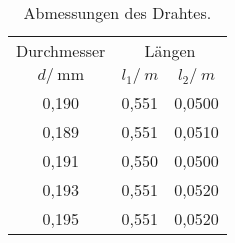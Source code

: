 \begin{table}[H]
	\centering
	\begin{tabular}{c cc}
		\toprule
		{Durchmesser} & \multicolumn{2}{c}{Längen} \\
		{$d/\:\si{\milli\meter}$} & {$l_1/\:\si{m}$} & {$l_2/\:\si{m}$}\\
		\midrule
			0,190 & 0,551 & 0,0500 \\
			0,189 & 0,551 & 0,0510 \\
			0,191 & 0,550 & 0,0500 \\
			0,193 & 0,551 & 0,0520 \\
			0,195 & 0,551 & 0,0520 \\
		\bottomrule
	\end{tabular}
	\caption{Abmessungen des Drahtes.}
	\label{tab:draht}
\end{table}